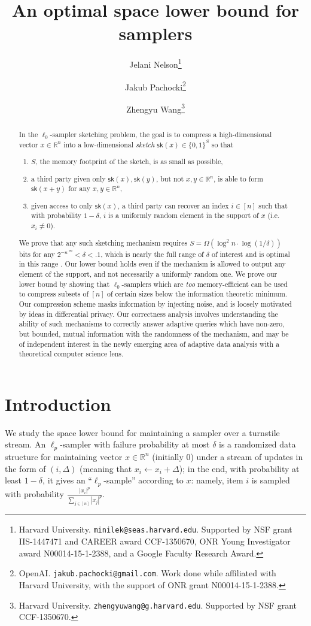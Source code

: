\documentclass[10pt]{article}
\title{An optimal space lower bound for samplers}
\author{Jelani Nelson\thanks{Harvard University. \texttt{minilek@seas.harvard.edu}. Supported by NSF grant IIS-1447471 and
   CAREER award CCF-1350670, ONR Young Investigator award N00014-15-1-2388, and a Google Faculty Research Award.}
  \and Jakub Pachocki\thanks{OpenAI. \texttt{jakub.pachocki@gmail.com}. Work done while affiliated with Harvard University, with the support of ONR grant N00014-15-1-2388.}
  \and Zhengyu Wang\thanks{Harvard University. \texttt{zhengyuwang@g.harvard.edu}. Supported by NSF grant CCF-1350670.}}
\newcommand{\R}{\mathbb{R}}
\newcommand{\sk}{\mathsf{sk}}
\begin{document}
\maketitle

\begin{abstract}
In the $\ell_0$-sampler sketching problem, the goal is to compress a high-dimensional vector $x\in\R^n$ into a low-dimensional {\em sketch} $\sk(x)\in\{0,1\}^S$ so that
\begin{enumerate}
\item $S$, the memory footprint of the sketch, is as small as possible,
\item a third party given only $\sk(x), \sk(y)$, but not $x, y\in\R^n$, is able to form $\sk(x+y)$ for any $x,y\in\R^n$,
\item given access to only $\sk(x)$, a third party can recover an index $i\in[n]$ such that with probability $1-\delta$, $i$ is a uniformly random element in the support of $x$ (i.e.\ $x_i\neq 0$).
\end{enumerate}
We prove that any such sketching mechanism requires $S = \Omega(\log^2 n\cdot \log(1/\delta))$ bits for any $2^{-n^{.99}} < \delta < .1$, which is nearly the full range of $\delta$ of interest and is optimal in this range \cite{jowhari2011tight}. Our lower bound holds even if the mechanism is allowed to output any element of the support, and not necessarily a uniformly random one. We prove our lower bound by showing that $\ell_0$-samplers which are {\em too} memory-efficient can be used to compress subsets of $[n]$ of certain sizes below the information theoretic minimum. Our compression scheme masks information by injecting noise, and is loosely motivated by ideas in differential privacy. Our correctness analysis involves understanding the ability of such mechanisms to correctly answer adaptive queries which have non-zero, but bounded, mutual information with the randomness of the mechanism, and may be of independent interest in the newly emerging area of adaptive data analysis with a theoretical computer science lens.
\end{abstract}


\section{Introduction}
We study the space lower bound for maintaining a sampler over a turnstile stream. An $\ell_p$-sampler with failure probability at most $\delta$ is a randomized data structure for maintaining vector $x\in \mathbb{R}^n$ (initially 0) under a stream of updates in the form of $(i, \Delta)$ (meaning that $x_i \leftarrow x_i+\Delta$); in the end, with probability at least $1-\delta$, it gives an ``$\ell_p$-sample'' according to $x$: namely, item $i$ is sampled with probability $\frac{|x_i|^p}{\sum_{j\in [n]}{|x_j|^p}}$. 
\end{document}
